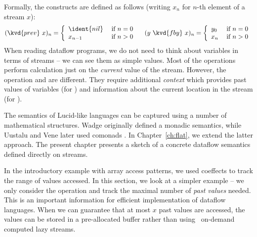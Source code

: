 Formally, the constructs are defined as follows (writing $x_n$ for $n$-th element of a stream $x$):
%
\[
(\kvd{prev}~x)_n = \left\{
  \begin{array}{ll}
    \ident{nil}     & \; \text{if $n=0$}\\
    x_{n-1} & \; \text{if $n>0$}
  \end{array} \right.
\quad
(y~\kvd{fby}~x)_n = \left\{
  \begin{array}{ll}
    y_0     & \; \text{if $n=0$}\\
    x_n     & \; \text{if $n>0$}
  \end{array} \right.
\]
%
When reading dataflow programs, we do not need to think about variables in terms of streams --
we can see them as simple values. Most of the operations perform calculation just on the
\emph{current} value of the stream. However, the operation  and  are different.
They require additional \emph{context} which provides past values of variables
(for ) and information about the current location in the stream (for ).

The semantics of Lucid-like languages can be captured using a number of mathematical
structures. Wadge \cite{app-lucid-monads} originally defined a monadic semantics, while Uustalu
and Vene later used comonads \cite{app-dataflow-essence}. In Chapter~\ref{ch:flat}, we extend
the latter approach. The present chapter presents a sketch of a concrete dataflow semantics
defined directly on streams.

In the introductory example with array access patterns, we used coeffects to track the range
of values accessed. In this section, we look at a simpler example -- we only consider the
 operation and track the maximal number of \emph{past values} needed. This is an
important information for efficient implementation of dataflow languages. When we can guarantee
that at most $x$ past values are accessed, the values can be stored in a pre-allocated buffer
rather than using \eg~on-demand computed lazy streams.


